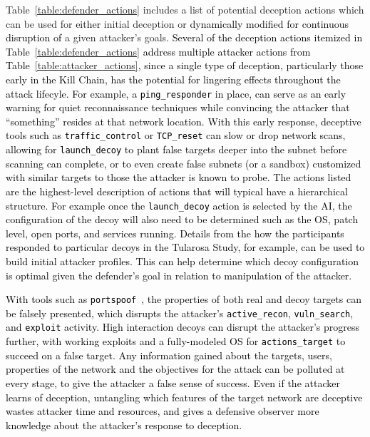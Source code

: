 \documentclass{article}
\newcommand\kjf[1]{\textcolor{black}{#1}}
\newcommand\nnn[1]{\textcolor{black}{#1}}
\begin{document}
Table~\ref{table:defender_actions} includes a list of potential deception actions which can be used for \nnn{either} initial deception or \nnn{dynamically modified for continuous disruption of} a given attacker's goals. 
\nnn{Several of the deception actions itemized in Table~\ref{table:defender_actions} address multiple attacker actions from Table~\ref{table:attacker_actions}, since a single type of deception, particularly those early in the Kill Chain, has the potential for lingering effects throughout the attack lifecyle. For example, a \texttt{ping\_responder} in place, can serve as an early warning for quiet reconnaissance techniques while convincing the attacker that ``something'' resides at that network location. With this early response, deceptive tools such as \texttt{traffic\_control} or \texttt{TCP\_reset} can slow or drop network scans, allowing for \texttt{launch\_decoy} to plant false targets deeper into the subnet before scanning can complete, or to even create false subnets (or a sandbox) customized with similar targets to those the attacker is known to probe. \kjf{The actions listed are the highest-level description of actions that will typical have a hierarchical structure. For example once the \texttt{launch\_decoy} action is selected by the AI, the configuration of the decoy will also need to be determined such as the OS, patch level, open ports, and services running. Details from the how the participants responded to particular decoys in the Tularosa Study, for example, can be used to build initial attacker profiles. This can help determine which decoy configuration is optimal given the defender's goal in relation to manipulation of the attacker.} }
	
	\nnn{With tools such as \texttt{portspoof}~\cite{portspoof}, the properties of both real and decoy targets can be falsely presented, which disrupts the attacker's \texttt{active\_recon}, \texttt{vuln\_search}, and \texttt{exploit} activity. High interaction decoys can disrupt the attacker's progress further, with working exploits and a fully-modeled OS for \texttt{actions\_target} to succeed on a false target. Any information gained about the targets, users, properties of the network and the objectives for the attack can be polluted at every stage, to give the attacker a false sense of success. Even if the attacker learns of deception, untangling which features of the target network are deceptive wastes attacker time and resources, and gives a defensive observer more knowledge about the attacker's response to deception.}
\end{document}
